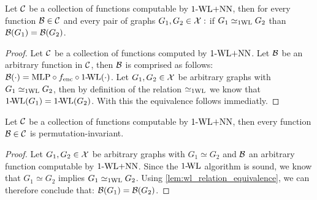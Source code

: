 \begin{lemma}\label{lem:wl_relation_equivalence}
    Let $\mathcal{C}$ be a collection of functions computable by $\text{1-WL+NN}$, then for every function $\mathcal{B} \in \mathcal{C}$ and every pair of graphs $G_1, G_2 \in \mathcal{X}:$ if $G_1 \simeq_{\text{1WL}} G_2$ than $\mathcal{B}(G_1) = \mathcal{B}(G_2)$.
\end{lemma}

\begin{proof}
    Let $\mathcal{C}$ be a collection of functions computed by $\text{1-WL+NN}$. Let $\mathcal{B}$ be an arbitrary function in $\mathcal{C}$, then $\mathcal{B}$ is comprised as follows: $\mathcal{B}(\cdot) = \text{MLP} \circ f_{\text{enc}} \circ \text{1-\!WL}(\cdot)$. Let $G_1, G_2 \in \mathcal{X}$ be arbitrary graphs with $G_1 \simeq_{\text{1WL}} G_2$, then by definition of the relation $\simeq_{\text{1WL}}$ we know that $\text{1-\!WL}(G_1) = \text{1-\!WL}(G_2)$. With this the equivalence follows immediatly.
\end{proof}

\begin{lemma}\label{lem:wlnn_permutation_invariance}
    Let $\mathcal{C}$ be a collection of functions computable by $\text{1-WL+NN}$, then every function $\mathcal{B} \in \mathcal{C}$ is permutation-invariant.
\end{lemma}

\begin{proof}
    Let $G_1, G_2 \in \mathcal{X}$ be arbitrary graphs with $G_1 \simeq G_2$ and $\mathcal{B}$ an arbitrary function computable by $\text{1-WL+NN}$. Since the $\text{1-\!WL}$ algorithm is sound, we know that $G_1 \simeq G_2$ implies $G_1 \simeq_{\text{1WL}} G_2$. Using \cref{lem:wl_relation_equivalence}, we can therefore conclude that: $\mathcal{B}(G_1) = \mathcal{B}(G_2)$.
\end{proof}

